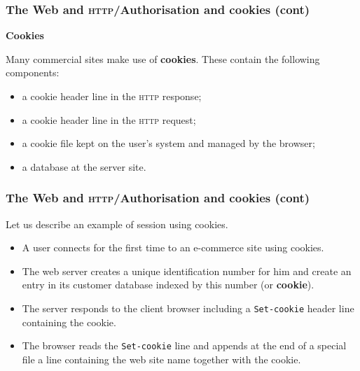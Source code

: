 %
\begin{frame}
\frametitle{The Web and \textsc{http}/Authorisation and cookies (cont)}

\textbf{Cookies}

Many commercial sites make use of \textbf{cookies}. These contain the
following components:
\begin{itemize}

  \item a cookie header line in the \textsc{http} response;

  \item a cookie header line in the \textsc{http} request;

  \item a cookie file kept on the user's system and managed by the
  browser;

  \item a database at the server site.

\end{itemize}

\end{frame}

%
\begin{frame}[containsverbatim]
\frametitle{The Web and \textsc{http}/Authorisation and cookies (cont)}

Let us describe an example of session using cookies.
\begin{itemize}

  \item A user connects for the first time to an e-commerce site using
    cookies.

  \item The web server creates a unique identification number for
    him and create an entry in its customer database indexed by this
    number (or \textbf{cookie}).

  \item The server responds to the client browser including a
    \verb+Set-cookie+ header line containing the cookie.

  \item The browser reads the \verb+Set-cookie+ line and appends at
    the end of a special file a line containing the web site name
    together with the cookie.

\end{itemize}

\end{frame}

